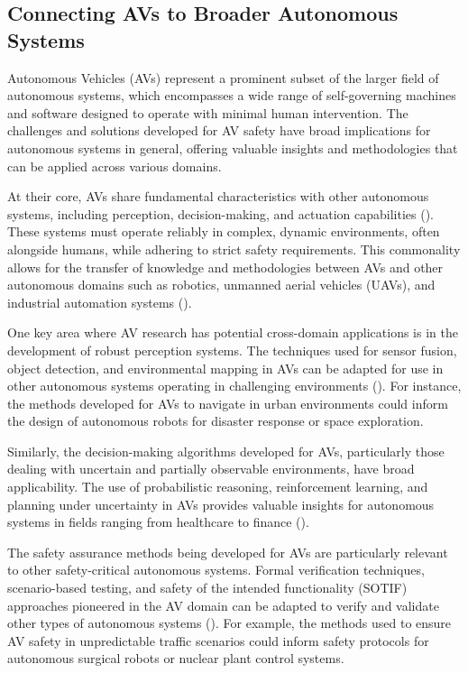 
\subsection{Connecting AVs to Broader Autonomous Systems}

Autonomous Vehicles (AVs) represent a prominent subset of the larger field of autonomous systems, which encompasses a wide range of self-governing machines and software designed to operate with minimal human intervention. The challenges and solutions developed for AV safety have broad implications for autonomous systems in general, offering valuable insights and methodologies that can be applied across various domains.

At their core, AVs share fundamental characteristics with other autonomous systems, including perception, decision-making, and actuation capabilities (\cite{Scharre2018}). These systems must operate reliably in complex, dynamic environments, often alongside humans, while adhering to strict safety requirements. This commonality allows for the transfer of knowledge and methodologies between AVs and other autonomous domains such as robotics, unmanned aerial vehicles (UAVs), and industrial automation systems (\cite{Kaber2018}).

One key area where AV research has potential cross-domain applications is in the development of robust perception systems. The techniques used for sensor fusion, object detection, and environmental mapping in AVs can be adapted for use in other autonomous systems operating in challenging environments (\cite{Thrun2005}). For instance, the methods developed for AVs to navigate in urban environments could inform the design of autonomous robots for disaster response or space exploration.

Similarly, the decision-making algorithms developed for AVs, particularly those dealing with uncertain and partially observable environments, have broad applicability. The use of probabilistic reasoning, reinforcement learning, and planning under uncertainty in AVs provides valuable insights for autonomous systems in fields ranging from healthcare to finance (\cite{Russell2015}).

The safety assurance methods being developed for AVs are particularly relevant to other safety-critical autonomous systems. Formal verification techniques, scenario-based testing, and safety of the intended functionality (SOTIF) approaches pioneered in the AV domain can be adapted to verify and validate other types of autonomous systems (\cite{Koopman2019}). For example, the methods used to ensure AV safety in unpredictable traffic scenarios could inform safety protocols for autonomous surgical robots or nuclear plant control systems.

